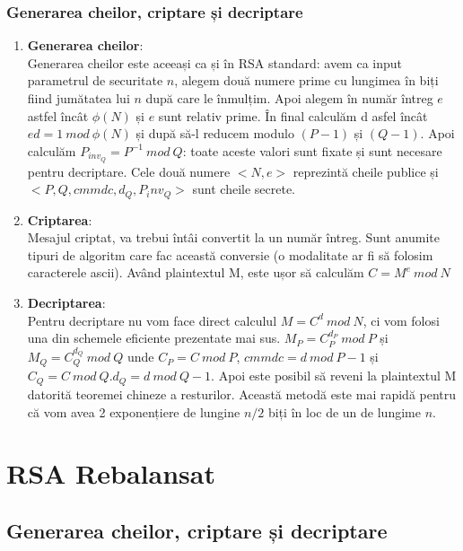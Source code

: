 \documentclass[12]{report}
\begin{document}
	  \subsubsection{Generarea cheilor, criptare și decriptare}
	  \begin{enumerate}
	    \item \textbf{Generarea cheilor}: \\
	    Generarea cheilor este aceeași ca și în RSA standard: avem ca input parametrul de securitate $n$, alegem două numere prime cu lungimea în biți fiind jumătatea lui $n$ după care le înmulțim. Apoi alegem în număr întreg $e$ astfel încât $ \phi(N) $ și $e$ sunt relativ prime. În final calculăm d asfel încât $ ed=1 \ mod \ \phi(N)$ și după să-l reducem modulo $(P-1)$ și $(Q-1)$. Apoi calculăm $P_{inv_Q} = P^{-1} \ mod \ Q$: toate aceste valori sunt fixate și sunt necesare pentru decriptare. Cele două numere $<N,e>$ reprezintă cheile publice și $<P,Q,cmmdc,d_Q,P_inv_Q>$ sunt cheile secrete.
	    
	    \item \textbf{ Criptarea}: \\
	    Mesajul criptat, va trebui întâi convertit la un număr întreg. Sunt anumite tipuri de algoritm care fac această conversie (o modalitate ar fi să folosim caracterele ascii). Având plaintextul M, este ușor să calculăm $C = M^e \ mod \ N$
	    
	    \item \textbf{Decriptarea}: \\
	    Pentru decriptare nu vom face direct calculul $M=C^d \ mod \ N$, ci vom folosi una din schemele eficiente prezentate mai sus. $M_P= C_{P}^{d_P} \ mod \ P$ și $M_Q = C_{Q}^{d_Q} \ mod \ Q $ unde $C_P = C \ mod \ P$, $cmmdc= d \ mod \ P-1 $ și $C_Q = C \ mod \ Q. d_Q = d \ mod \ Q-1 $. Apoi este posibil să reveni la plaintextul M datorită teoremei chineze a resturilor. Această metodă este mai rapidă pentru că vom avea 2 exponențiere de lungine $n/2$ biți în loc de un de lungime $n$.
	  \end{enumerate}
	  
	  \section{RSA Rebalansat}
	   \subsection{Generarea cheilor, criptare și decriptare}
\end{document}
